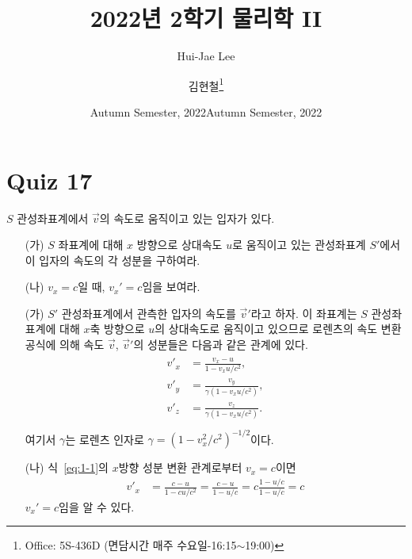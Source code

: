 \documentclass[tightenlines,floatfix,nofootinbib,superscriptaddress,fleqn]{revtex4}
\begin{document}
\title{\Large 2022년 2학기 물리학 II}
\author{Hui-Jae Lee} 
\date{Autumn Semester, 2022}
\author{김현철\footnote{Office: 5S-436D (면담시간 매주
    수요일-16:15$\sim$19:00)}} 
\date{Autumn Semester, 2022}
\maketitle


\section*{\large Quiz 17}
$S$ 관성좌표계에서 $\vec{v}$의 속도로 움직이고 있는 입자가 있다.
\begin{itemize}
\item[(가)]  $S$ 좌표계에 대해 $x$ 방향으로 상대속도 $u$로 움직이고
  있는 관성좌표계 $S'$에서 이 입자의 속도의 각 성분을 구하여라. 
\item[(나)] $v_x=c$일 때, $v_x'=c$임을 보여라. 
\end{itemize}

\begin{itemize}
  \item[(가)] $S'$ 관성좌표계에서 관측한 입자의 속도를 $\vec{v}'$라고 하자. 이 좌표계는
  $S$ 관성좌표계에 대해 $x$축 방향으로 $u$의 상대속도로 움직이고 있으므로 로렌츠의 속도
  변환 공식에 의해 속도 $\vec{v}$, $\vec{v}'$의 성분들은 다음과 같은 관계에 있다.
  \begin{align}\label{eq:1-1}
    \begin{split}
      v'_x &=\frac{v_x-u}{1-v_x u/c^2},  \\
      v'_y &=\frac{v_y}{\gamma(1-v_x u/c^2)}, \\
      v'_z &=\frac{v_z}{\gamma(1-v_x u/c^2)} .\\
    \end{split}
  \end{align}
  여기서 $\gamma$는 로렌츠 인자로 $\gamma=(1-v_x^2/c^2)^{-1/2}$이다.
  \item[(나)]
  식~\eqref{eq:1-1}의 $x$방향 성분 변환 관계로부터 $v_x=c$이면
  \begin{align}
    v'_x &=\frac{c-u}{1-c u/c^2}=\frac{c-u}{1-u/c}=c\frac{1-u/c}{1-u/c}=c
  \end{align}
  $v_x'=c$임을 알 수 있다.
\end{itemize}
\end{document}
